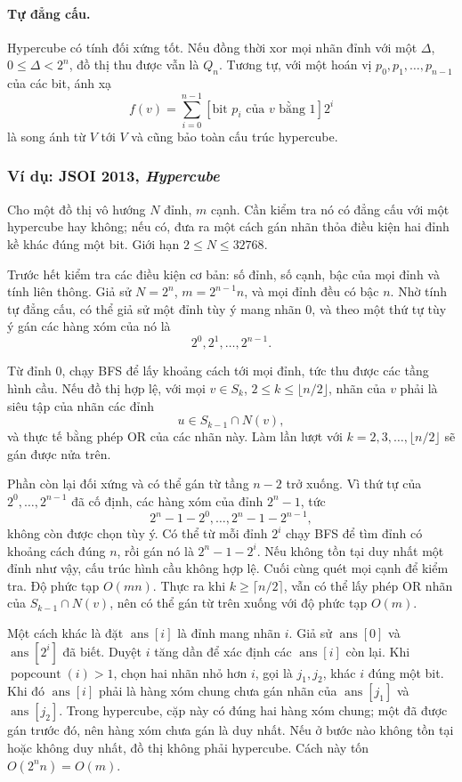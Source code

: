 \documentclass[11pt]{article}
\begin{document}
\paragraph{Tự đẳng cấu.}
Hypercube có tính đối xứng tốt. Nếu đồng thời xor mọi nhãn đỉnh với một
\(\Delta\), \(0\le\Delta<2^n\), đồ thị thu được vẫn là \(Q_n\). Tương tự, với
một hoán vị \(p_0,p_1,\ldots,p_{n-1}\) của các bit, ánh xạ
\[
  f(v)=\sum_{i=0}^{n-1} [\text{bit }p_i\text{ của }v\text{ bằng }1]2^i
\]
là song ánh từ \(V\) tới \(V\) và cũng bảo toàn cấu trúc hypercube.

\subsubsection{Ví dụ: JSOI 2013, \emph{Hypercube}}

Cho một đồ thị vô hướng \(N\) đỉnh, \(m\) cạnh. Cần kiểm tra nó có đẳng cấu với
một hypercube hay không; nếu có, đưa ra một cách gán nhãn thỏa điều kiện hai
đỉnh kề khác đúng một bit. Giới hạn \(2\le N\le 32768\).

Trước hết kiểm tra các điều kiện cơ bản: số đỉnh, số cạnh, bậc của mọi đỉnh và
tính liên thông. Giả sử \(N=2^n\), \(m=2^{n-1}n\), và mọi đỉnh đều có bậc
\(n\). Nhờ tính tự đẳng cấu, có thể giả sử một đỉnh tùy ý mang nhãn \(0\), và
theo một thứ tự tùy ý gán các hàng xóm của nó là
\[
  2^0,2^1,\ldots,2^{n-1}.
\]

Từ đỉnh \(0\), chạy BFS để lấy khoảng cách tới mọi đỉnh, tức thu được các tầng
hình cầu. Nếu đồ thị hợp lệ, với mọi \(v\in S_k\), \(2\le k\le\lfloor n/2\rfloor\),
nhãn của \(v\) phải là siêu tập của nhãn các đỉnh
\[
  u\in S_{k-1}\cap N(v),
\]
và thực tế bằng phép OR của các nhãn này. Làm lần lượt với
\(k=2,3,\ldots,\lfloor n/2\rfloor\) sẽ gán được nửa trên.

Phần còn lại đối xứng và có thể gán từ tầng \(n-2\) trở xuống. Vì thứ tự của
\(2^0,\ldots,2^{n-1}\) đã cố định, các hàng xóm của đỉnh \(2^n-1\), tức
\[
  2^n-1-2^0,\ldots,2^n-1-2^{n-1},
\]
không còn được chọn tùy ý. Có thể từ mỗi đỉnh \(2^i\) chạy BFS để tìm đỉnh có
khoảng cách đúng \(n\), rồi gán nó là \(2^n-1-2^i\). Nếu không tồn tại duy nhất
một đỉnh như vậy, cấu trúc hình cầu không hợp lệ. Cuối cùng quét mọi cạnh để
kiểm tra. Độ phức tạp \(O(mn)\). Thực ra khi \(k\ge\lceil n/2\rceil\), vẫn có
thể lấy phép OR nhãn của \(S_{k-1}\cap N(v)\), nên có thể gán từ trên xuống
với độ phức tạp \(O(m)\).

Một cách khác là đặt \(\operatorname{ans}[i]\) là đỉnh mang nhãn \(i\). Giả sử
\(\operatorname{ans}[0]\) và \(\operatorname{ans}[2^i]\) đã biết. Duyệt \(i\)
tăng dần để xác định các \(\operatorname{ans}[i]\) còn lại. Khi
\(\operatorname{popcount}(i)>1\), chọn hai nhãn nhỏ hơn \(i\), gọi là
\(j_1,j_2\), khác \(i\) đúng một bit. Khi đó \(\operatorname{ans}[i]\) phải là
hàng xóm chung chưa gán nhãn của \(\operatorname{ans}[j_1]\) và
\(\operatorname{ans}[j_2]\). Trong hypercube, cặp này có đúng hai hàng xóm
chung; một đã được gán trước đó, nên hàng xóm chưa gán là duy nhất. Nếu ở bước
nào không tồn tại hoặc không duy nhất, đồ thị không phải hypercube. Cách này
tốn \(O(2^n n)=O(m)\).
\end{document}
